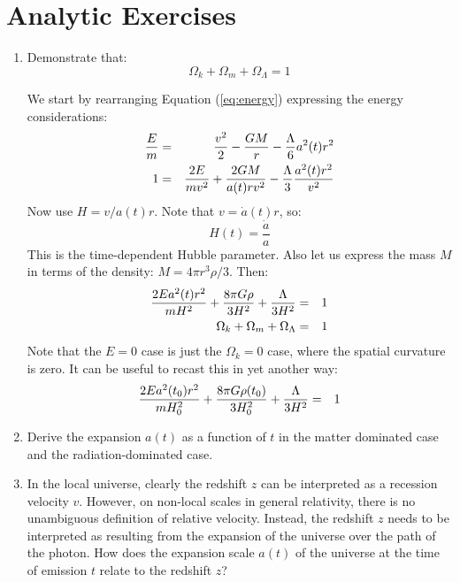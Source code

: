 \section{Analytic Exercises}

\begin{enumerate}
\item Demonstrate that:
\begin{equation}
\Omega_k + \Omega_m + \Omega_\Lambda = 1
\end{equation}
\begin{answer}
We start by rearranging Equation (\ref{eq:energy}) expressing the
energy considerations:
\begin{eqnarray}
\frac{E}{m} &=& \frac{v^2}{2}-\frac{GM}{r} - \frac{\Lambda}{6}a^2(t)r^2 \cr
1 &=& \frac{2E}{mv^2} + \frac{2GM}{a(t) rv^2} -
\frac{\Lambda}{3}\frac{a^2(t) r^2}{v^2} 
\end{eqnarray}
Now use $H=v/a(t)r$. Note that $v={\dot a}(t) r$, so:
\begin{equation}
H(t) = \frac{\dot a}{a}
\end{equation}
This is the time-dependent Hubble parameter. Also let us express the
mass $M$ in terms of the density: $M=4\pi r^3\rho/3$. Then:
\begin{eqnarray}
\frac{2Ea^2(t) r^2}{mH^2} + \frac{8\pi
  G\rho}{3H^2}+\frac{\Lambda}{3H^2} &=& 1 \cr 
\Omega_k + \Omega_m + \Omega_\Lambda &=& 1
\end{eqnarray}
Note that the $E=0$ case is just the $\Omega_k=0$ case, where the
spatial curvature is zero. It can be useful to recast this in yet
another way:
\begin{eqnarray}
\frac{2Ea^2(t_0) r^2}{mH_0^2} + \frac{8\pi
  G\rho(t_0)}{3H_0^2}+\frac{\Lambda}{3H^2} &=& 1 \cr 
\end{eqnarray}
\end{answer}
\item Derive the expansion $a(t)$ as a function of $t$ in the matter
dominated case and the radiation-dominated case.
\item 
In the local universe, clearly the redshift $z$ can be interpreted as
a recession velocity $v$.  However, on non-local scales in general
relativity, there is no unambiguous definition of relative
velocity. Instead, the redshift $z$ needs to be interpreted as
resulting from the expansion of the universe over the path of the
photon.  How does the expansion scale $a(t)$ of the universe at the
time of emission $t$ relate to the redshift $z$?


\end{enumerate}
